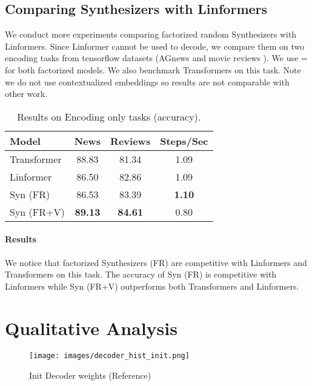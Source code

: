\documentclass{article}
\begin{document}
\subsection{Comparing Synthesizers with Linformers}
We conduct more experiments comparing factorized random Synthesizers with Linformers. Since Linformer cannot be used to decode, we compare them on two encoding tasks from tensorflow datasets (AGnews \citep{zhang2015character} and movie reviews \citep{maas-EtAl:2011:ACL-HLT2011}). We use = for both factorized models. We also benchmark Transformers on this task. Note we do not use contextualized embeddings so results are not comparable with other work. 
\begin{table}[H]
    \centering
    \begin{tabular}{l|ccc}
    \toprule
      Model   &  News & Reviews & Steps/Sec   \\
      \midrule
     Transformer    & 88.83 & 81.34 & 1.09 \\
     Linformer  & 86.50&  82.86 & 1.09\\ 
     \midrule
Syn (FR) & 86.53 & 83.39 & \textbf{1.10}\\
     Syn (FR+V) & \textbf{89.13} & \textbf{84.61} & 0.80\\ 
         \bottomrule
    \end{tabular}
    \caption{Results on Encoding only tasks (accuracy).}
    \label{tab:my_label}
\end{table}
\paragraph{Results} We notice that factorized Synthesizers (FR) are competitive with Linformers and Transformers on this task. The accuracy of Syn (FR) is competitive with Linformers while Syn (FR+V) outperforms both Transformers and Linformers.

\section{Qualitative Analysis}

\begin{figure}
 \centering
     \texttt{[image: images/decoder\_hist\_init.png]}
    \caption{Init Decoder weights (Reference)}
    \label{fig:init}
\end{figure}
\end{document}
